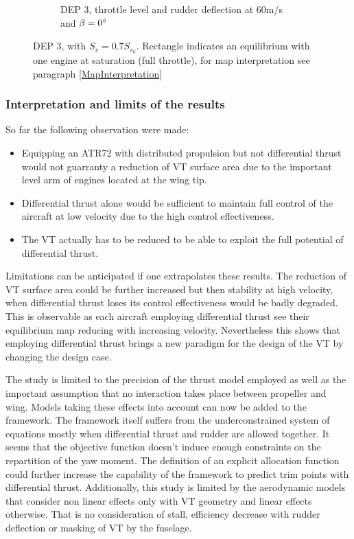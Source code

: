 \begin{figure}[hbt!]
\begin{subfigure}{0.49\textwidth}
		\caption{DEP 3, throttle level and rudder deflection at 60m/s and $\beta=0\degree$}
		\label{fig:DeflDEPoriginalfin07_15Eng}
	\end{subfigure}
	\caption{DEP 3, with $S_v=0.7S_{v_0}$. Rectangle indicates an equilibrium with one engine at saturation (full throttle), for map interpretation see paragraph \ref{MapInterpretation}}\label{fig:DEPfin07_15enginesMap+Defl}
\end{figure}

\subsubsection{Interpretation and limits of the results}
So far the following observation were made:
\begin{itemize}
	\item Equipping an ATR72 with distributed propulsion but not differential thrust would not guarranty a reduction of VT surface area due to the important level arm of engines located at the wing tip.
	\item Differential thrust alone would be sufficient to maintain full control of the aircraft at low velocity due to the high control effectiveness.
	\item The VT actually has to be reduced to be able to exploit the full potential of differential thrust.
\end{itemize}
\vspace{0.25cm}
Limitations can be anticipated if one extrapolates these results. The reduction of VT surface area could be further increased but then stability at high velocity, when differential thrust loses its control effectiveness would be badly degraded. This is observable as each aircraft employing differential thrust see their equilibrium map reducing with increasing velocity. Nevertheless this shows that employing differential thrust brings a new paradigm for the design of the VT by changing the design case.

The study is limited to the precision of the thrust model employed as well as the important assumption that no interaction takes place between propeller and wing. Models taking these effects into account can now be added to the framework.
The framework itself suffers from the underconstrained system of equations mostly when differential thrust and rudder are allowed together. It seems that the objective function doesn't induce enough constraints on the repartition of the yaw moment. The definition of an explicit allocation function could further increase the capability of the framework to predict trim points with differential thrust. Additionally, this study is limited by the aerodynamic models that consider non linear effects only with VT geometry and linear effects otherwise. That is no consideration of stall, efficiency decrease with rudder deflection or masking of VT by the fuselage.

